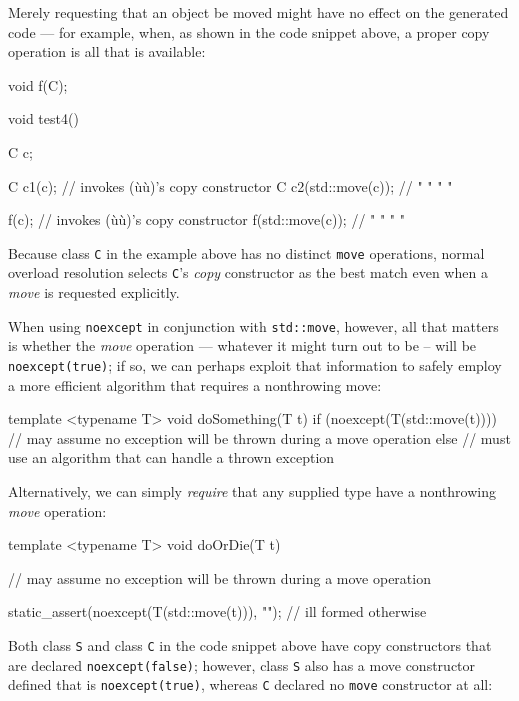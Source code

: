 \noindent Merely requesting that an object be moved might have no effect on the
generated code --- for example, when, as shown in the code snippet
above, a proper copy operation is all that is available:

\begin{emcppslisting}[emcppsbatch=e10]
void f(C);

void test4()
{
    C c;

    C c1(c);             // invokes (ù{}ù)'s copy constructor
    C c2(std::move(c));  //    "      "     "       "

    f(c);                // invokes (ù{}ù)'s copy constructor
    f(std::move(c));     //    "      "     "       "
}
\end{emcppslisting}
    

\noindent Because class \lstinline!C! in the example above has no distinct
\lstinline!move! operations, normal overload resolution selects
\lstinline!C!'s \emph{copy} constructor as the best match even when a
\emph{move} is requested explicitly.

When using \lstinline!noexcept! in conjunction with \lstinline!std::move!,
however, all that matters is whether the \emph{move} operation ---
whatever it might turn out to be -- will be \lstinline!noexcept(true)!; if
so, we can perhaps exploit that information to safely employ a more
efficient algorithm that requires a nonthrowing move:

\begin{emcppslisting}[emcppsbatch=e11]
template <typename T>
void doSomething(T t)
{
    if (noexcept(T(std::move(t))))
    {
        // may assume no exception will be thrown during a move operation
    }
    else
    {
        // must use an algorithm that can handle a thrown exception
    }
}
\end{emcppslisting}
    

\noindent Alternatively, we can simply \emph{require} that any supplied type have
a nonthrowing \emph{move} operation:

\begin{emcppslisting}[emcppsbatch=e11]
template <typename T>
void doOrDie(T t)
{
    // may assume no exception will be thrown during a move operation

    static_assert(noexcept(T(std::move(t))), "");  // ill formed otherwise
}
\end{emcppslisting}
    

\noindent Both class \lstinline!S! and class \lstinline!C! in the code snippet above
have copy constructors that are declared \lstinline!noexcept(false)!;
however, class \lstinline!S! also has a move constructor defined that is
\lstinline!noexcept(true)!, whereas \lstinline!C! declared no \lstinline!move!
constructor at all:

